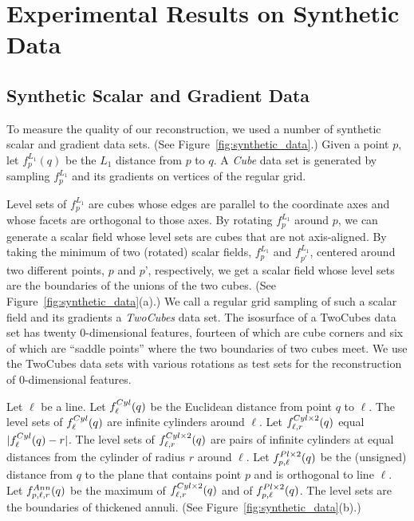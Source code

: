 \newcommand{\fCYL}   {\emath{f^{Cyl}}}
\newcommand{\fCII}   {\emath{f^{Cyl \times 2}}}
\newcommand{\fPL}    {\emath{f^{Pl}}}
\newcommand{\fPLII}  {\emath{f^{Pl \times 2}}}
\newcommand{\fANN}   {\emath{f^{Ann}}}
\newcommand{\fCN}    {\emath{f^{Cone}}}
\newcommand{\fSCN}   {\emath{f^{SCone}}}
\newcommand{\fTCN}   {\emath{f^{TCone}}}
\newcommand{\fFR}    {\emath{f^{Fr}}}
\newcommand{\fX}     {\emath{f^{X}}}
\newcommand{\fCAN}   {\emath{f^{Can}}}
\newcommand{\NneqII} {\emath{N_{\neq 2}}}


\section{Experimental Results on Synthetic Data}\label{sec:synData}
\label{section:results}

\subsection{Synthetic Scalar and Gradient Data}
\label{section:synthetic}

To measure the quality of our reconstruction,
we used a number of synthetic scalar and gradient data sets.
(See Figure~\ref{fig:synthetic_data}.)
Given a point $p$,
let $f^{L_1}_{p}(q)$ be the $L_1$ distance from $p$ to $q$.
A {\em Cube} data set is generated by sampling $f^{L_1}_p$
and its gradients on vertices of the regular grid.

Level sets of $f^{L_1}_p$ are cubes whose edges are
parallel to the coordinate axes
and whose facets are orthogonal to those axes.
By rotating $f^{L_1}_p$ around $p$, 
we can generate a scalar field whose level sets are cubes
that are not axis-aligned.
By taking the minimum of two (rotated) scalar fields, 
$f^{L_1}_p$ and $f^{L_1}_{p'}$, 
centered around two different points, $p$ and $p$', respectively,
we get a scalar field whose level sets are the boundaries
of the unions of the two cubes.
(See Figure~\ref{fig:synthetic_data}(a).)
We call a regular grid sampling of such a scalar field
and its gradients a {\em TwoCubes} data set.
The isosurface of a TwoCubes data set has twenty 0-dimensional features,
fourteen of which are cube corners and six of which are ``saddle points''
where the two boundaries of two cubes meet.
We use the TwoCubes data sets with various rotations
as test sets for the reconstruction of 0-dimensional features.

Let $\ell$ be a line.
Let $\fCYL_{\ell}(q)$ be the Euclidean distance from point $q$ to $\ell$.
The level sets of $\fCYL_{\ell}(q)$ are infinite cylinders around $\ell$.
Let $\fCII_{\ell,r}(q)$ equal $|\fCYL_{\ell}(q) - r|$.
The level sets of $\fCII_{\ell,r}(q)$  are pairs of infinite cylinders
at equal distances from the cylinder of radius $r$ around $\ell$.
Let $\fPLII_{p,\ell}(q)$ be the (unsigned) distance from $q$ to the plane
that contains point $p$ and is orthogonal to line $\ell$.
Let $\fANN_{p,\ell,r}(q)$ be the maximum 
of $\fCII_{\ell,r}(q)$ and of $\fPLII_{p,\ell}(q)$.
The level sets are the boundaries of thickened annuli.
(See Figure~\ref{fig:synthetic_data}(b).)

